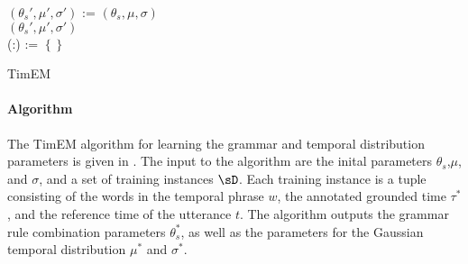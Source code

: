 \begin{algorithm}
	$(\theta_s',\mu',\sigma')$ := $(\theta_s,\mu,\sigma)$ \\
	\KwRet $(\theta_s',\mu',\sigma')$ \\
	\Begin(:){
		\sH := $\left\{\right\}$ \\
		\Return{\sH}
	}

	\caption{
		\label{alg:pseudocode}
		TimEM 
	}
\end{algorithm}

\paragraph{Algorithm}
The TimEM algorithm for learning the grammar and temporal distribution 
	parameters is given in .
The input to the algorithm are the inital parameters $\theta_s$,$\mu$, and
	$\sigma$, and a set of training instances $\sD$.
Each training instance is a tuple consisting of the words in the temporal
	phrase $w$, the annotated grounded time $\tau^*$, and the reference time
	of the utterance $t$.
The algorithm outputs the grammar rule combination parameters $\theta_s^*$,
	as well as the parameters for the Gaussian temporal distribution
	$\mu^*$ and $\sigma^*$.

